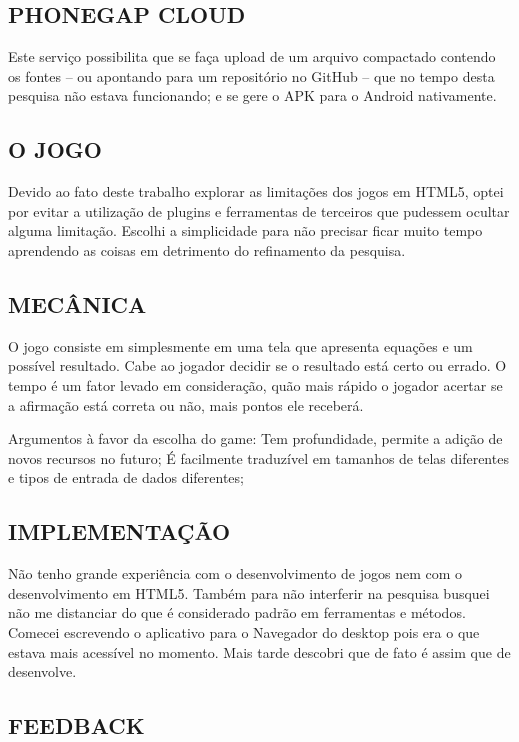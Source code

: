 \documentclass[11pt,a4paper]{article}
\begin{document}
\subsection{ PHONEGAP CLOUD}

Este serviço possibilita que se faça upload de um arquivo compactado contendo os fontes – ou apontando para um repositório no GitHub – que no tempo desta pesquisa não estava funcionando; e se gere o APK para o Android nativamente.

\subsection{ O JOGO}

Devido ao fato deste trabalho explorar as limitações dos jogos em HTML5, optei por evitar a utilização de plugins e ferramentas de terceiros que pudessem ocultar alguma limitação.
Escolhi a simplicidade para não precisar ficar muito tempo aprendendo as coisas em detrimento do refinamento da pesquisa.

\subsection{MECÂNICA}

O jogo consiste em simplesmente em uma tela que apresenta equações e um possível resultado. Cabe ao jogador decidir se o resultado está certo ou errado. O tempo é um fator levado em consideração, quão mais rápido o jogador acertar se a afirmação está correta ou não, mais pontos ele receberá.

Argumentos à favor da escolha do game:
Tem profundidade, permite a adição de novos recursos no futuro;
É facilmente traduzível em tamanhos de telas diferentes e tipos de entrada de dados diferentes;

\subsection{IMPLEMENTAÇÃO}

Não tenho grande experiência com o desenvolvimento de jogos nem com o desenvolvimento em HTML5. Também para não interferir na pesquisa busquei não me distanciar do que é considerado padrão em ferramentas e métodos.
Comecei escrevendo o aplicativo para o Navegador do desktop pois era o que estava mais acessível no momento. Mais tarde descobri que de fato é assim que de desenvolve.

\subsection{ FEEDBACK}
\end{document}
